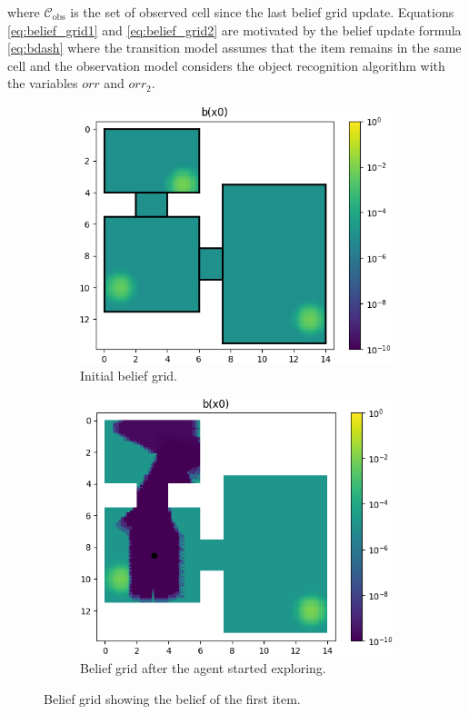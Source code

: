 %
where $\mathcal{C}_\text{obs}$ is the set of observed cell since the last belief grid update. Equations \ref{eq:belief_grid1} and \ref{eq:belief_grid2} are motivated by the belief update formula \ref{eq:bdash} where the transition model assumes that the item remains in the same cell and the observation model considers the object recognition algorithm with the variables $orr$ and $orr_2$. 
%
\begin{figure}
    \centering
    \begin{subfigure}[t]{0.48\textwidth}
        \includegraphics[width=\textwidth]{Report/images/belief_sc03.png}
        \caption{Initial belief grid.}
        \label{subfig:b_sc03}
    \end{subfigure}
    \hfill
    \begin{subfigure}[t]{0.48\textwidth}
        \includegraphics[width=\textwidth]{Report/images/belief_sc03_observed.png}
        \caption{Belief grid after the agent started exploring.}
        \label{subfig:b_sc03_observed}
    \end{subfigure}
    \caption{Belief grid showing the belief of the first item.}
    \label{fig:belief_grid}
\end{figure}
%
